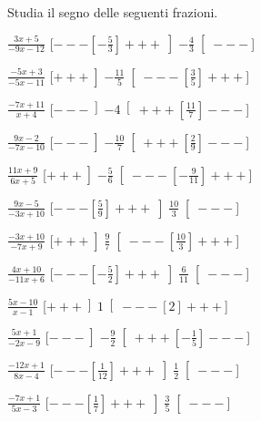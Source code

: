\begin{esercizio}\label{ese:dis_8}
 Studia il segno delle seguenti frazioni.
\begin{multicols}{2}
 \begin{enumeratea}
  \item  $\frac{3 x +5}{-9 x -12}$ \hfill 
  [$---\left [-\frac{5}{3} \right ]+++\left ]-\frac{4}{3} \right [---$]
  \item  $\frac{-5 x +3}{-5 x -11}$ \hfill 
  [$+++\left ]-\frac{11}{5} \right [---\left [\frac{3}{5} \right ]+++$]
  \item  $\frac{-7 x +11}{x +4}$ \hfill 
  [$---\left ]-4 \right [+++\left [\frac{11}{7} \right ]---$]
  \item  $\frac{9 x -2}{-7 x -10}$ \hfill 
  [$---\left ]-\frac{10}{7} \right [+++\left [\frac{2}{9} \right ]---$]
  \item  $\frac{11 x +9}{6 x +5}$ \hfill 
  [$+++\left ]-\frac{5}{6} \right [---\left [-\frac{9}{11} \right ]+++$]
  \item  $\frac{9 x -5}{-3 x +10}$ \hfill 
  [$---\left [\frac{5}{9} \right ]+++\left ]\frac{10}{3} \right [---$]
  \item  $\frac{-3 x +10}{-7 x +9}$ \hfill 
  [$+++\left ]\frac{9}{7} \right [---\left [\frac{10}{3} \right ]+++$]
  \item  $\frac{4 x +10}{-11 x +6}$ \hfill 
  [$---\left [-\frac{5}{2} \right ]+++\left ]\frac{6}{11} \right [---$]
  \item  $\frac{5 x -10}{x -1}$ \hfill 
  [$+++\left ]1 \right [---\left [2 \right ]+++$]
  \item  $\frac{5 x +1}{-2 x -9}$ \hfill 
  [$---\left ]-\frac{9}{2} \right [+++\left [-\frac{1}{5} \right ]---$]
  \item  $\frac{-12 x +1}{8 x -4}$ \hfill 
  [$---\left [\frac{1}{12} \right ]+++\left ]\frac{1}{2} \right [---$]
  \item  $\frac{-7 x +1}{5 x -3}$ \hfill 
  [$---\left [\frac{1}{7} \right ]+++\left ]\frac{3}{5} \right [---$]
 \end{enumeratea}
\end{multicols}
\end{esercizio}

\subsubsection*{}

